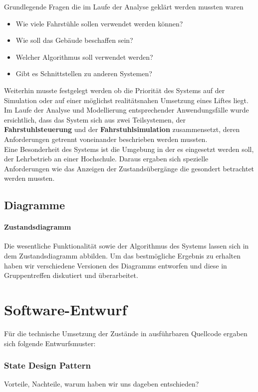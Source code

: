 Grundlegende Fragen die im Laufe der Analyse geklärt werden mussten waren
\begin{itemize}
	\item Wie viele Fahrstühle sollen verwendet werden können?
	\item Wie soll das Gebäude beschaffen sein?
	\item Welcher Algorithmus soll verwendet werden?
	\item Gibt es Schnittstellen zu anderen Systemen?
\end{itemize}
Weiterhin musste festgelegt werden ob die Priorität des Systems auf der
Simulation oder auf einer möglichst realitätsnahen Umsetzung eines Liftes liegt.
Im Laufe der Analyse und Modellierung entsprechender Anwendungsfälle
wurde ersichtlich, dass das System sich aus zwei Teilsystemen, der
\textbf{Fahrstuhlsteuerung} und der \textbf{Fahrstuhlsimulation} zusammensetzt,
deren Anforderungen getrennt voneinander beschrieben werden mussten.\\
Eine Besonderheit des Systems ist die Umgebung in der es eingesetzt werden
soll, der Lehrbetrieb an einer Hochschule. Daraus ergaben sich spezielle
Anforderungen wie das Anzeigen der Zustandsübergänge die gesondert betrachtet
werden mussten.
\section{Diagramme}
\subsubsection{Zustandsdiagramm}
Die wesentliche Funktionalität sowie der Algorithmus des Systems lassen sich in
dem Zustandsdiagramm abbilden. Um das bestmögliche Ergebnis zu erhalten haben
wir verschiedene Versionen des Diagramms entworfen und diese in Gruppentreffen diskutiert und überarbeitet.


\chapter{Software-Entwurf}
Für die technische Umsetzung der Zustände in ausführbaren Quellcode ergaben sich folgende Entwurfsmuster:
\subsection*{State Design Pattern}
Vorteile, Nachteile, warum haben wir uns dageben entschieden?
